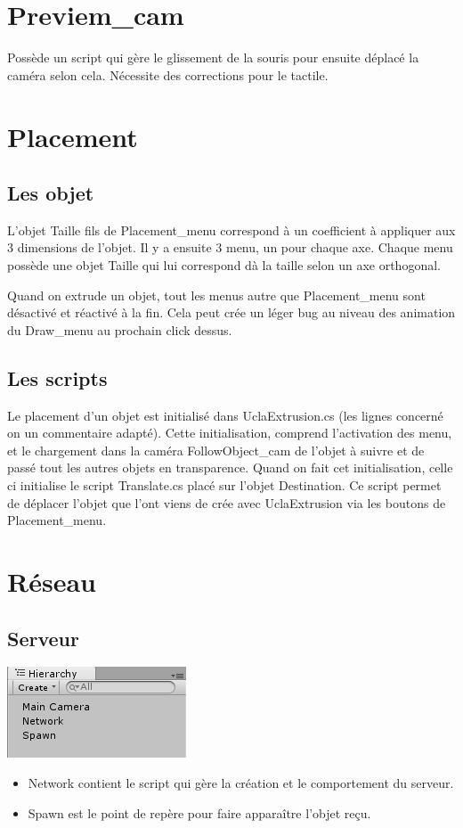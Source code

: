 \documentclass[a4paper,11pt]{article}
\begin{document}
\section{Previem\_cam}
		Possède un script qui gère le glissement de la souris pour ensuite déplacé la caméra selon cela. Nécessite des corrections pour le tactile.
\section{Placement}
		\subsection{Les objet}
			L'objet Taille fils de Placement\_menu correspond à un coefficient à appliquer aux 3 dimensions de l'objet. Il y a ensuite 3 menu, un pour chaque axe. Chaque menu possède une objet Taille qui lui correspond dà la taille selon un axe orthogonal.
			
			Quand on extrude un objet, tout les menus autre que Placement\_menu sont désactivé et réactivé à la fin. Cela peut crée un léger bug au niveau des animation du Draw\_menu au prochain click dessus.
		\subsection{Les scripts}
			Le placement d'un objet est initialisé dans UclaExtrusion.cs (les lignes concerné on un commentaire adapté). Cette initialisation, comprend l'activation des menu, et le chargement dans la caméra FollowObject\_cam de l'objet à suivre et de passé tout les autres objets en transparence.
			Quand on fait cet initialisation, celle ci initialise le script Translate.cs placé sur l'objet Destination. Ce script permet de déplacer l'objet que l'ont viens de crée avec UclaExtrusion via les boutons de Placement\_menu.
\section{Réseau}
	\subsection{Serveur}
		\includegraphics[scale=0.9]{./images/arbserver.png}
		\begin{itemize}
			\item Network contient le script qui gère la création et le comportement du serveur.
			\item Spawn est le point de repère pour faire apparaître l'objet reçu.
		\end{itemize}
		
\end{document}
